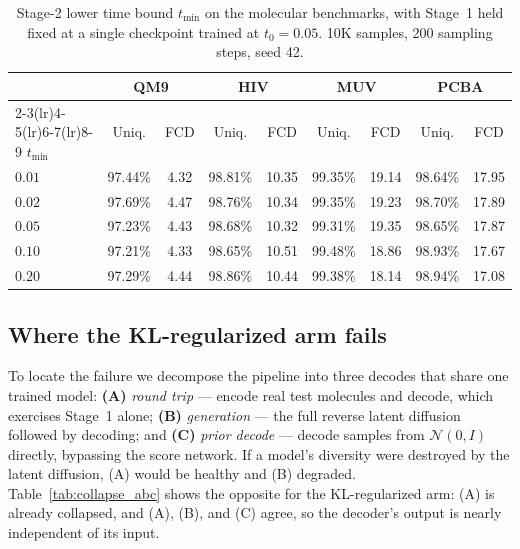 \begin{table}[h]
\centering
\caption{%
Stage-2 lower time bound $t_{\min}$ on the molecular benchmarks, with Stage~1
held fixed at a single checkpoint trained at $t_0=0.05$. 10K samples, 200
sampling steps, seed 42.%
}
\label{tab:stage2_tmin}
\small
\begin{tabular}{lcccccccc}
\toprule
& \multicolumn{2}{c}{\textbf{QM9}} & \multicolumn{2}{c}{\textbf{HIV}}
& \multicolumn{2}{c}{\textbf{MUV}} & \multicolumn{2}{c}{\textbf{PCBA}} \\
\cmidrule(lr){2-3}\cmidrule(lr){4-5}\cmidrule(lr){6-7}\cmidrule(lr){8-9}
$t_{\min}$ & Uniq. & FCD & Uniq. & FCD & Uniq. & FCD & Uniq. & FCD \\
\midrule
$0.01$ & 97.44\% & 4.32 & 98.81\% & 10.35 & 99.35\% & 19.14 & 98.64\% & 17.95 \\
$0.02$ & 97.69\% & 4.47 & 98.76\% & 10.34 & 99.35\% & 19.23 & 98.70\% & 17.89 \\
$0.05$ & 97.23\% & 4.43 & 98.68\% & 10.32 & 99.31\% & 19.35 & 98.65\% & 17.87 \\
$0.10$ & 97.21\% & 4.33 & 98.65\% & 10.51 & 99.48\% & 18.86 & 98.93\% & 17.67 \\
$0.20$ & 97.29\% & 4.44 & 98.86\% & 10.44 & 99.38\% & 18.14 & 98.94\% & 17.08 \\
\bottomrule
\end{tabular}
\end{table}

\subsection{Where the KL-regularized arm fails}
\label{app:collapse}

To locate the failure we decompose the pipeline into three decodes that share
one trained model: \textbf{(A)} \emph{round trip} --- encode real test
molecules and decode, which exercises Stage~1 alone; \textbf{(B)}
\emph{generation} --- the full reverse latent diffusion followed by decoding;
and \textbf{(C)} \emph{prior decode} --- decode samples from
$\mathcal N(0,I)$ directly, bypassing the score network. If a model's
diversity were destroyed by the latent diffusion, (A) would be healthy and
(B) degraded. Table~\ref{tab:collapse_abc} shows the opposite for the
KL-regularized arm: (A) is already collapsed, and (A), (B), and (C) agree,
so the decoder's output is nearly independent of its input.

